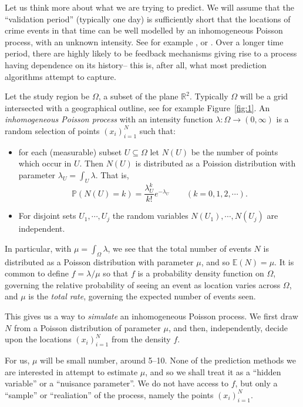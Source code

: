 \documentclass[twoside,a4paper,twocolumn,10pt]{article}
\theoremstyle{plain}
\theoremstyle{definition}
\begin{document}
Let us think more about what we are trying to predict.  We will assume that the ``validation
period'' (typically one day) is sufficiently short that the locations of crime events in
that time can be  well modelled by an inhomogeneous Poisson process, with an unknown
intensity.  See for example \cite[Chapter~8]{bcg}, \cite[Chapter~3]{mw} or
\cite[Chapter~8]{cressie}.
Over a longer time period, there are highly likely to be feedback mechanisms giving rise
to a process having dependence on its history-- this is, after all, what most prediction
algorithms attempt to capture.

Let the study region be $\Omega$, a subset of the plane $\mathbb R^2$.  Typically $\Omega$ will
be a grid intersected with a geographical outline, see for example Figure~\ref{fig:1}.
An \emph{inhomogeneous Poisson process}
with an intensity function $\lambda:\Omega \rightarrow (0,\infty)$
is a random selection of points $(x_i)_{i=1}^N$ such that:
\begin{itemize}
\item for each (measurable) subset $U\subseteq \Omega$ let $N(U)$ be the number of points
which occur in $U$.  Then $N(U)$ is distributed as a Poission distribution with parameter
$\lambda_U = \int_U \lambda$.  That is,
\[ \mathbb P(N(U)=k) = \frac{\lambda_U^k}{k!} e^{-\lambda_U} \qquad (k=0,1,2,\cdots). \]
\item For disjoint sets $U_1,\cdots,U_j$ the random variables $N(U_1),\cdots, N(U_j)$
are independent.
\end{itemize}
In particular, with $\mu = \int_\Omega \lambda$, we see that the total number of events
$N$ is distributed as a Poisson distribution with parameter $\mu$, and so $\mathbb E(N) =\mu$.
It is common to define $f = \lambda / \mu$ so that $f$ is a probability density function on 
$\Omega$, governing the relative probability of seeing an event as location varies across
$\Omega$, and $\mu$ is the \emph{total rate}, governing the expected number of events seen.

This gives us a way to \emph{simulate} an inhomogeneous Poisson process.  We first draw
$N$ from a Poisson distribution of parameter $\mu$, and then, independently, decide upon
the locations $(x_i)_{i=1}^N$ from the density $f$.

For us, $\mu$ will be small number, around 5--10.  None of the prediction methods we are
interested in attempt to estimate $\mu$, and so we shall treat it as a ``hidden variable'' or
a ``nuisance parameter''.  We do not have access to $f$, but only a ``sample'' or ``realiation''
of the process, namely the points $(x_i)_{i=1}^N$.
\end{document}
